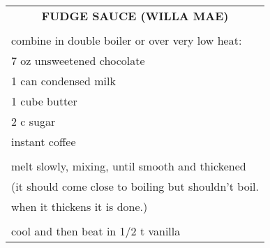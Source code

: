 \documentclass[8pt]{report}
\begin{document}
\newpage

\centering

\begin{tabular}{|l|} \hline	%
 
\multicolumn{1}{|c|}{\textbf{FUDGE SAUCE (WILLA MAE)}}
\\
\\

\index{desserts!fudge sauce (willa mae)} \index{fudge sauce}
\index{chocolate!fudge sauce}




combine in double boiler or over very low heat:\\
\hspace{0.5 in}	7 oz unsweetened chocolate\\
\hspace{0.5 in}	1 can condensed milk\\
\hspace{0.5 in}	1 cube butter\\
\hspace{0.5 in}	2 c sugar\\
\hspace{0.5 in}	instant coffee\\
\\
melt slowly, mixing, until smooth and thickened\\
(it should come close to boiling but shouldn't boil.\\
when it thickens it is done.)\\
\\
cool and then beat in 1/2 t vanilla\\
\hline

\end{tabular}


\newpage

\centering
\end{document}
